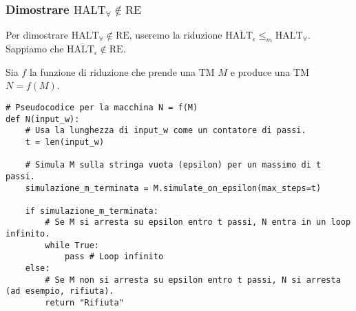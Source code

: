 \documentclass[a4paper]{article}
\theoremstyle{definition} %
\begin{document}
\subsubsection{Dimostrare $\text{HALT}_\forall \notin \text{RE}$}
Per dimostrare $\text{HALT}_\forall \notin \text{RE}$, useremo la riduzione $\overline{\text{HALT}_\epsilon} \le_m \text{HALT}_\forall$.
Sappiamo che $\overline{\text{HALT}_\epsilon} \notin \text{RE}$.

Sia $f$ la funzione di riduzione che prende una TM $M$ e produce una TM $N = f(M)$.
\begin{verbatim}
# Pseudocodice per la macchina N = f(M)
def N(input_w):
    # Usa la lunghezza di input_w come un contatore di passi.
    t = len(input_w)
    
    # Simula M sulla stringa vuota (epsilon) per un massimo di t passi.
    simulazione_m_terminata = M.simulate_on_epsilon(max_steps=t)
    
    if simulazione_m_terminata:
        # Se M si arresta su epsilon entro t passi, N entra in un loop infinito.
        while True:
            pass # Loop infinito
    else:
        # Se M non si arresta su epsilon entro t passi, N si arresta (ad esempio, rifiuta).
        return "Rifiuta"
\end{verbatim}
\end{document}
